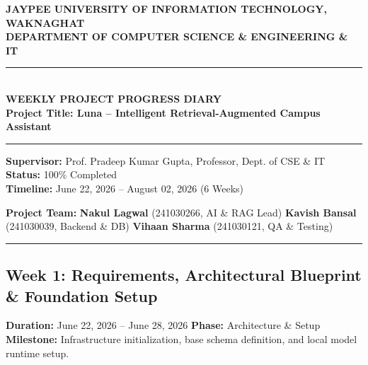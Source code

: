 \documentclass[11pt,a4paper]{article}
\begin{document}
\begin{center}
    {\large \textbf{JAYPEE UNIVERSITY OF INFORMATION TECHNOLOGY, WAKNAGHAT}}\\
    \vspace{0.1cm}
    {\normalsize \textbf{DEPARTMENT OF COMPUTER SCIENCE \& ENGINEERING \& IT}}\\
    \vspace{0.2cm}
    \rule{\textwidth}{0.8pt}\\
    \vspace{0.15cm}
    {\Large \textbf{WEEKLY PROJECT PROGRESS DIARY}}\\
    \vspace{0.1cm}
    {\normalsize \textbf{Project Title: Luna -- Intelligent Retrieval-Augmented Campus Assistant}}\\
    \vspace{0.15cm}
    \rule{\textwidth}{0.8pt}
\end{center}

\vspace{0.1cm}
\noindent \textbf{Supervisor:} Prof. Pradeep Kumar Gupta, Professor, Dept. of CSE \& IT \hfill \textbf{Status:} 100\% Completed \\
\textbf{Timeline:} June 22, 2026 -- August 02, 2026 (6 Weeks)

\vspace{0.2cm}
\noindent \textbf{Project Team:} \textbf{Nakul Lagwal} (241030266, AI \& RAG Lead) \hfill \textbf{Kavish Bansal} (241030039, Backend \& DB) \hfill \textbf{Vihaan Sharma} (241030121, QA \& Testing)

\vspace{0.2cm}
\hrule
\vspace{0.3cm}

\subsection*{Week 1: Requirements, Architectural Blueprint \& Foundation Setup}
\noindent \textbf{Duration:} June 22, 2026 -- June 28, 2026 \hfill \textbf{Phase:} Architecture \& Setup \\
\textbf{Milestone:} Infrastructure initialization, base schema definition, and local model runtime setup.
\end{document}
